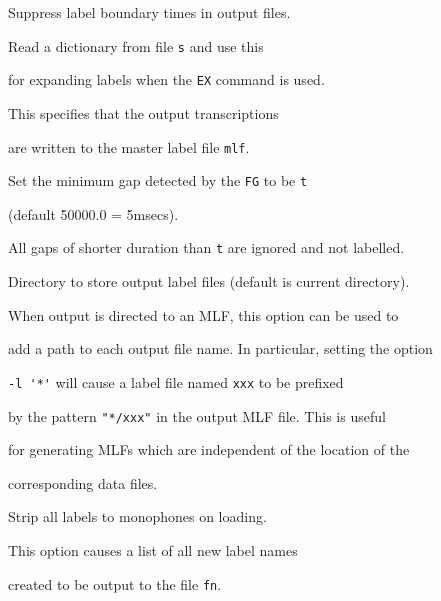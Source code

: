 \begin{optlist}





   Suppress label boundary times in output files.





   Read a dictionary from file {\tt s} and use this


  for expanding labels when the {\tt EX} command is used.





   This specifies that the output transcriptions


  are written to the master label file \texttt{mlf}.





   Set the minimum gap detected by the \texttt{FG} to be \texttt{t}


      (default 50000.0 = 5msecs).


     All gaps of shorter duration than \texttt{t} are ignored and not labelled.


  


   Directory to store output label files (default is current directory).


      When output is directed to an MLF,  this option can be used to


      add a path to each output file name.  In particular, setting the option


      \verb+-l '*'+ will cause a label file named \texttt{xxx} to be prefixed


      by the pattern \verb+"*/xxx"+ in the output MLF file.  This is useful


      for generating MLFs which are independent of the location of the 


      corresponding data files.





   Strip all labels to monophones on loading.


 


   This option causes a list of all new label names


      created to be output to the file \texttt{fn}.





\stdoptG


\stdoptI


\stdoptP


\stdoptX





\end{optlist}


